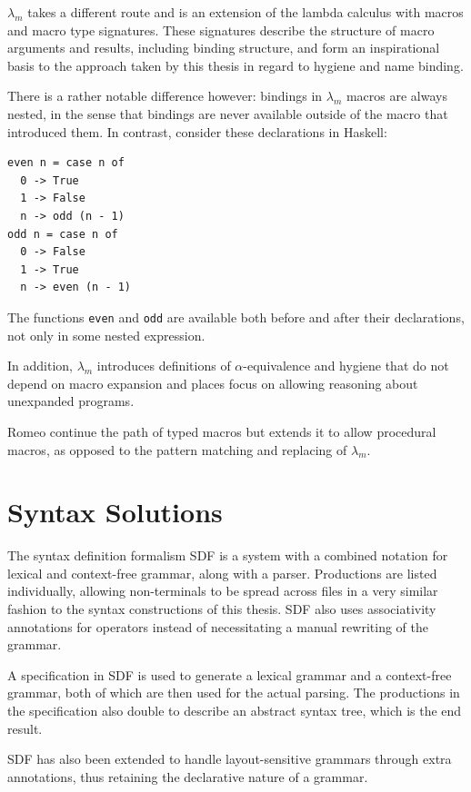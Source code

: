 \documentclass{kththesis}
\begin{document}
$\lambda_m$ \cite{Herman2010A-Theory-of-Typ} takes a different route and is an extension of the lambda calculus with macros and macro type signatures. These signatures describe the structure of macro arguments and results, including binding structure, and form an inspirational basis to the approach taken by this thesis in regard to hygiene and name binding.

There is a rather notable difference however: bindings in $\lambda_m$ macros are always nested, in the sense that bindings are never available outside of the macro that introduced them. In contrast, consider these declarations in Haskell:
\begin{verbatim}
even n = case n of
  0 -> True
  1 -> False
  n -> odd (n - 1)
odd n = case n of
  0 -> False
  1 -> True
  n -> even (n - 1)
\end{verbatim}
The functions \texttt{even} and \texttt{odd} are available both before and after their declarations, not only in some nested expression.

In addition, $\lambda_m$ introduces definitions of $\alpha$-equivalence and hygiene that do not depend on macro expansion and places focus on allowing reasoning about unexpanded programs.

Romeo \cite{Stansifer2014Romeo} continue the path of typed macros but extends it to allow procedural macros, as opposed to the pattern matching and replacing of $\lambda_m$.

\section{Syntax Solutions} \label{sec:syntax-solutions}

The syntax definition formalism SDF \cite{Heering1989The-syntax-defi} is a system with a combined notation for lexical and context-free grammar, along with a parser. Productions are listed individually, allowing non-terminals to be spread across files in a very similar fashion to the syntax constructions of this thesis. SDF also uses associativity annotations for operators instead of necessitating a manual rewriting of the grammar.

A specification in SDF is used to generate a lexical grammar and a context-free grammar, both of which are then used for the actual parsing. The productions in the specification also double to describe an abstract syntax tree, which is the end result.

SDF has also been extended \cite{Erdweg2013Layout-sensitiv} to handle layout-sensitive grammars through extra annotations, thus retaining the declarative nature of a grammar.
\end{document}
